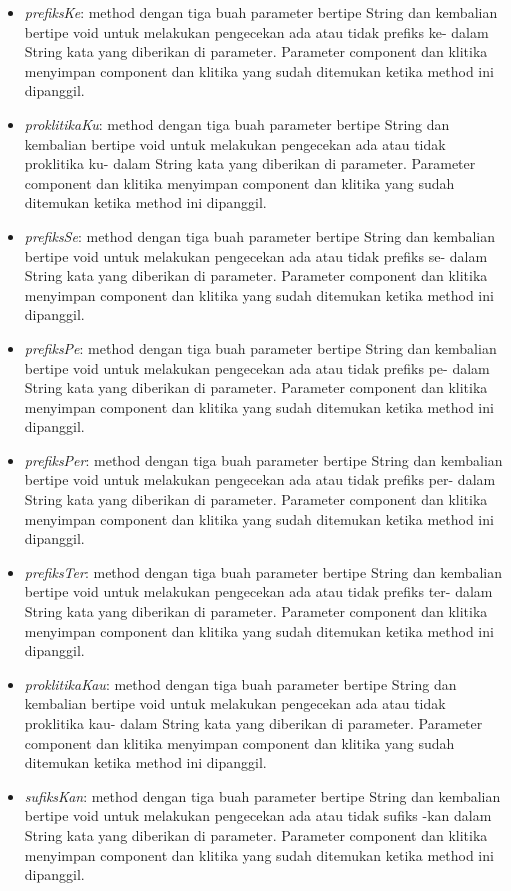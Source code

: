 \begin{itemize}
	\item \textit{prefiksKe}: method dengan tiga buah parameter bertipe String dan kembalian bertipe void untuk melakukan pengecekan ada atau tidak prefiks ke- dalam String kata yang diberikan di parameter. Parameter component dan klitika menyimpan component dan klitika yang sudah ditemukan ketika method ini dipanggil.
	\item \textit{proklitikaKu}: method dengan tiga buah parameter bertipe String dan kembalian bertipe void untuk melakukan pengecekan ada atau tidak proklitika ku- dalam String kata yang diberikan di parameter. Parameter component dan klitika menyimpan component dan klitika yang sudah ditemukan ketika method ini dipanggil.
	\item \textit{prefiksSe}: method dengan tiga buah parameter bertipe String dan kembalian bertipe void untuk melakukan pengecekan ada atau tidak prefiks se- dalam String kata yang diberikan di parameter. Parameter component dan klitika menyimpan component dan klitika yang sudah ditemukan ketika method ini dipanggil.
	\item \textit{prefiksPe}: method dengan tiga buah parameter bertipe String dan kembalian bertipe void untuk melakukan pengecekan ada atau tidak prefiks pe- dalam String kata yang diberikan di parameter. Parameter component dan klitika menyimpan component dan klitika yang sudah ditemukan ketika method ini dipanggil.
	\item \textit{prefiksPer}: method dengan tiga buah parameter bertipe String dan kembalian bertipe void untuk melakukan pengecekan ada atau tidak prefiks per- dalam String kata yang diberikan di parameter. Parameter component dan klitika menyimpan component dan klitika yang sudah ditemukan ketika method ini dipanggil.
	\item \textit{prefiksTer}: method dengan tiga buah parameter bertipe String dan kembalian bertipe void untuk melakukan pengecekan ada atau tidak prefiks ter- dalam String kata yang diberikan di parameter. Parameter component dan klitika menyimpan component dan klitika yang sudah ditemukan ketika method ini dipanggil.
	\item \textit{proklitikaKau}: method dengan tiga buah parameter bertipe String dan kembalian bertipe void untuk melakukan pengecekan ada atau tidak proklitika kau- dalam String kata yang diberikan di parameter. Parameter component dan klitika menyimpan component dan klitika yang sudah ditemukan ketika method ini dipanggil.
	\item \textit{sufiksKan}: method dengan tiga buah parameter bertipe String dan kembalian bertipe void untuk melakukan pengecekan ada atau tidak sufiks -kan dalam String kata yang diberikan di parameter. Parameter component dan klitika menyimpan component dan klitika yang sudah ditemukan ketika method ini dipanggil.

\end{itemize}
